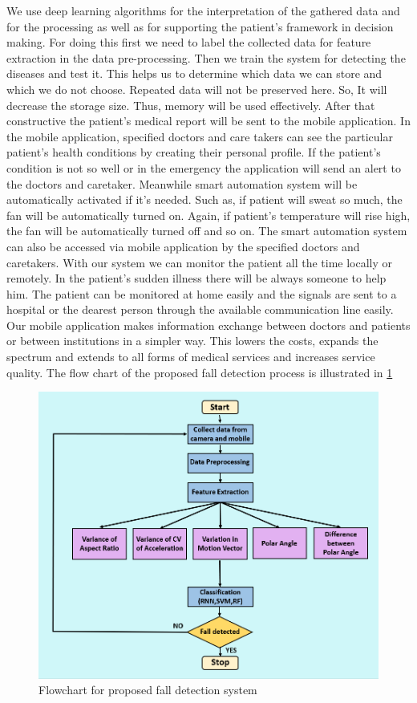  \vspace{0.5cm}
 We use deep learning algorithms for the interpretation of the gathered data and for the processing as well as for supporting the patient's framework in decision making. For doing this first we need to label the collected data for feature extraction in the data pre-processing. Then we train the system for detecting the diseases and test it. This helps us to determine which data we can store and which we do not choose. Repeated data will not be preserved here. So, It will decrease the storage size. Thus, memory will be used effectively. After that constructive the patient's medical report will be sent to the mobile application. In the mobile application, specified doctors and care takers can see the particular patient’s health conditions by creating their personal profile. If the patient’s condition is not so well or in the emergency the application will send an alert to the doctors and caretaker. Meanwhile smart automation system will be automatically activated if it’s needed. Such as, if patient will sweat so much, the fan will be automatically turned on. Again, if patient’s temperature will rise high, the fan will be automatically turned off and so on. The smart automation system can also be accessed via mobile application by the specified doctors and caretakers.  
With our system we can monitor the patient all the time locally or remotely. In the patient’s sudden illness there will be always someone to help him. The patient can be monitored at home easily and the signals are sent to a hospital or the dearest person through the available communication line easily. Our mobile application makes information exchange between doctors and patients or between institutions in a simpler way. This lowers the costs, expands the spectrum and extends to all forms of medical services and increases service quality.
The flow chart of the proposed fall detection process is illustrated in \ref{fig:fallchart}

\begin{figure}[ht]
    \centering
    \includegraphics[scale=0.5]{Chap3/Capture.PNG}
    \caption{Flowchart for proposed fall detection system}
    \label{fig:fallchart}
\end{figure}

